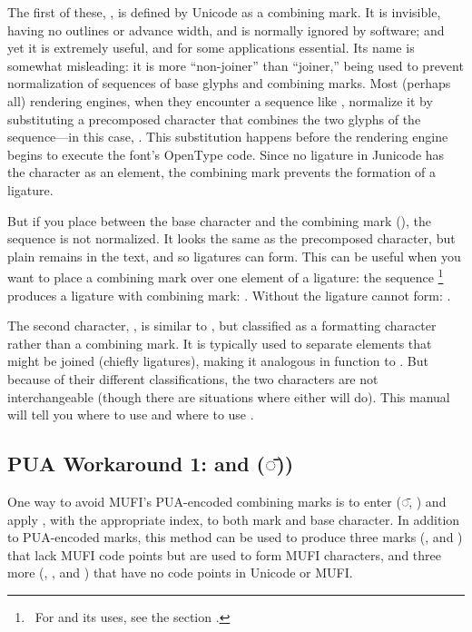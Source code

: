 The first of these, , is defined by Unicode as a combining mark. It is invisible, having no outlines
or advance width, and is normally ignored by software; and yet it is extremely useful, and for some
applications essential. Its name is somewhat misleading: it is more “non-joiner”
than “joiner,” being used to prevent normalization of sequences of base glyphs and combining marks. Most 
(perhaps all) rendering engines, when they encounter a sequence like ,
normalize it by substituting a precomposed character that combines the two glyphs of the sequence—in this 
case, . This substitution happens before the rendering engine begins to execute 
the font's OpenType code. Since no ligature in Junicode has the character  as an element, the 
combining mark  prevents the formation of a ligature.

But if you place  between the base character and the combining mark
(), the sequence is not normalized. It looks the same as the 
precomposed character, but plain  remains in the text, and so ligatures can form. This can be 
useful when you want to place a combining mark over one element of a ligature: the sequence \footnote{\ For  and its uses, see 
the section \hyperlink{zwj}{}.} produces a ligature with combining mark: 
. Without  the ligature cannot form:
.

The second character, , is similar to , but classified as a formatting 
character rather than a combining mark. It is typically used to separate elements that might be joined
(chiefly ligatures),
making it analogous in function to . But because of their different classifications, the 
two characters are not interchangeable (though there are situations where either will do).
This manual will tell you where to use  and where to use .


\subsection{PUA Workaround 1:  and  (◌̄))}\hypertarget{cv84}{}

One way to avoid MUFI’s PUA-encoded combining marks is to enter  (◌̄, ) and apply , with the appropriate index, to both mark and base character.
In addition to PUA-encoded marks, this method can be used to produce three marks (,
\textSourceText{[31]} and \textSourceText{[32]}) that lack MUFI code points but are used to form MUFI
characters, and three more (\textSourceText{[2]}, \textSourceText{[33]},
and \textSourceText{[34]}) that have no code points in Unicode or MUFI.

